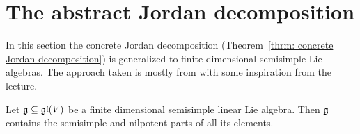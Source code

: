 \section{The abstract Jordan decomposition}
In this section the concrete Jordan decomposition (Theorem~\ref{thrm: concrete Jordan decomposition}) is generalized to finite dimensional semisimple Lie algebras. The approach taken is mostly from \cite[\S 4.2, \S 5.3, \S 5.4, \S 6.4]{Humphreys} with some inspiration from the lecture.


\begin{lemma}\label{lem: semisimple linear Lie algebra containing the semisimple and nilpotent parts of its elements}
 Let $\mathfrak{g} \subseteq \mathfrak{gl}(V)$ be a finite dimensional semisimple linear Lie algebra. Then $\mathfrak{g}$ contains the semisimple and nilpotent parts of all its elements.
\end{lemma}
